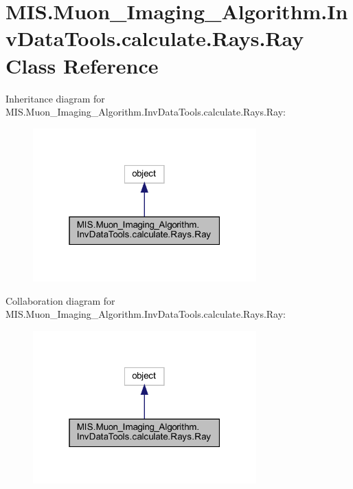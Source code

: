 \hypertarget{classMIS_1_1Muon__Imaging__Algorithm_1_1InvDataTools_1_1calculate_1_1Rays_1_1Ray}{}\section{M\+I\+S.\+Muon\+\_\+\+Imaging\+\_\+\+Algorithm.\+Inv\+Data\+Tools.\+calculate.\+Rays.\+Ray Class Reference}
\label{classMIS_1_1Muon__Imaging__Algorithm_1_1InvDataTools_1_1calculate_1_1Rays_1_1Ray}


Inheritance diagram for M\+I\+S.\+Muon\+\_\+\+Imaging\+\_\+\+Algorithm.\+Inv\+Data\+Tools.\+calculate.\+Rays.\+Ray\+:
\nopagebreak
\begin{figure}[H]
\begin{center}
\leavevmode
\includegraphics[width=244pt]{classMIS_1_1Muon__Imaging__Algorithm_1_1InvDataTools_1_1calculate_1_1Rays_1_1Ray__inherit__graph}
\end{center}
\end{figure}


Collaboration diagram for M\+I\+S.\+Muon\+\_\+\+Imaging\+\_\+\+Algorithm.\+Inv\+Data\+Tools.\+calculate.\+Rays.\+Ray\+:
\nopagebreak
\begin{figure}[H]
\begin{center}
\leavevmode
\includegraphics[width=244pt]{classMIS_1_1Muon__Imaging__Algorithm_1_1InvDataTools_1_1calculate_1_1Rays_1_1Ray__coll__graph}
\end{center}
\end{figure}
